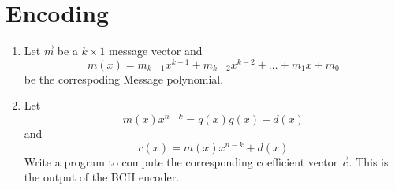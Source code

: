 \documentclass[journal,12pt,twocolumn]{IEEEtran}
\renewcommand\thesection{\arabic{section}}
\begin{document}
\section{Encoding}
\begin{enumerate}[label=\thesection.\arabic*
,ref=\thesection.\theenumi]
\item Let $\vec{m}$ be a $k \times 1$ message vector and  
\begin{equation}
m(x)=m_{k-1}x^{k-1}+m_{k-2}x^{k-2}+\dots+m_1x+m_0
\end{equation} 
be the  correspoding Message polynomial. 
\item Let 
\begin{equation}
m(x)x^{n-k} = q(x)g(x)+d(x)
\end{equation} 
and 
\begin{equation}
c(x)=m(x)x^{n-k}+d(x)
\end{equation}
%
Write a program to compute the corresponding coefficient vector $\vec{c}$. This is the output of the BCH 
encoder.
\end{enumerate}
\end{document}
